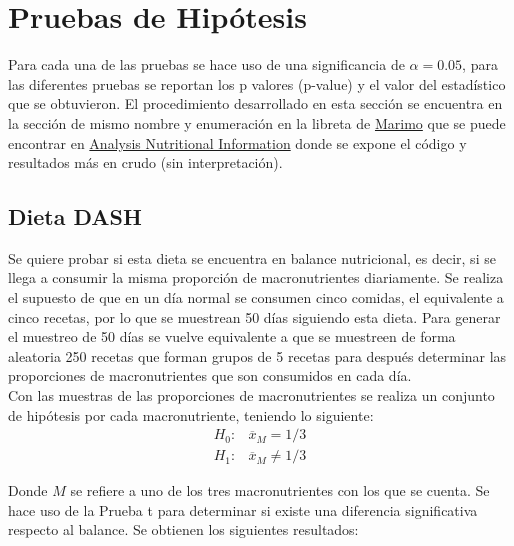 \documentclass[12pt,a4paper]{article}
\begin{document}
    \section{Pruebas de Hipótesis}
    {
        Para cada una de las pruebas se hace uso de una significancia de $\alpha = 0.05$, 
        para las diferentes pruebas se reportan los p valores (p-value) y el valor del 
        estadístico que se obtuvieron. El procedimiento 
        desarrollado en esta sección se encuentra en la sección de mismo nombre y 
        enumeración en la libreta de \href{https://github.com/marimo-team/marimo}{Marimo} 
        que se puede encontrar en \href{https://github.com/alexisuaguilaru/Analysis_Nutritional_Information/blob/main/Documentation/AlexisAguilar_ReporteFinal.py}{Analysis Nutritional Information} 
        donde se expone el código y resultados más en crudo (sin interpretación).
    
        \subsection{Dieta DASH}
        {
            Se quiere probar si esta dieta se encuentra 
            en balance nutricional, es decir, si se llega a consumir la 
            misma proporción de macronutrientes diariamente. 
            Se realiza el supuesto de que en un día normal se consumen 
            cinco comidas, el equivalente a cinco recetas, por lo que 
            se muestrean 50 días siguiendo esta dieta. 
            Para generar el muestreo de 50 días se vuelve equivalente a 
            que se muestreen de forma aleatoria 250 recetas que forman 
            grupos de 5 recetas para después determinar las proporciones 
            de macronutrientes que son consumidos en cada día.\\

            Con las muestras de las proporciones de macronutrientes se realiza 
            un conjunto de hipótesis por cada macronutriente, teniendo lo 
            siguiente:
            \begin{align*}
                H_0 :& \overline{x}_M = 1/3  \\
                H_1 :& \overline{x}_M \ne 1/3 
            \end{align*}
        
            Donde $M$ se refiere a uno de los tres macronutrientes con los que 
            se cuenta. Se hace uso de la Prueba t para determinar si existe 
            una diferencia significativa respecto al balance. Se obtienen 
            los siguientes resultados:

}}
\end{document}
